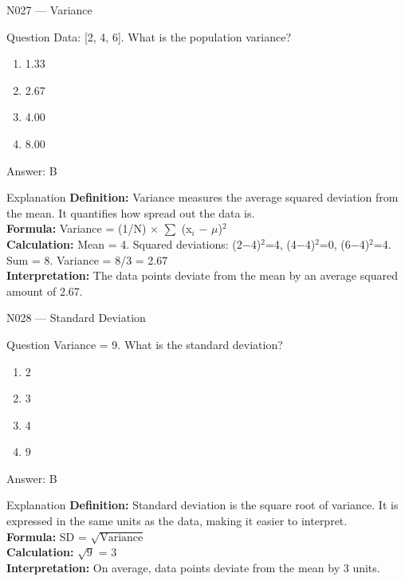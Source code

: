\documentclass[aspectratio=169,8pt]{beamer}
\begin{document}
	\begin{frame}{N027 --- Variance}
		\begin{block}{Question}
			Data: [2, 4, 6]. What is the population variance?
			\begin{enumerate}
				\item 1.33
				\item 2.67
				\item 4.00
				\item 8.00
			\end{enumerate}
		\end{block}
		\begin{exampleblock}{Answer: B}\end{exampleblock}
		\begin{block}{Explanation}
			\textbf{Definition:} Variance measures the average squared deviation from the mean. It quantifies how spread out the data is.\\
			\textbf{Formula:} Variance = (1/N) $\times$ $\sum$ (x$_{i}$ $-$ $\mu$)$^{2}$\\
			\textbf{Calculation:} Mean = 4. Squared deviations: (2$-$4)$^{2}$=4, (4$-$4)$^{2}$=0, (6$-$4)$^{2}$=4. Sum = 8. Variance = 8/3 = 2.67\\
			\textbf{Interpretation:} The data points deviate from the mean by an average squared amount of 2.67.
		\end{block}
	\end{frame}
	
	\begin{frame}{N028 --- Standard Deviation}
		\begin{block}{Question}
			Variance = 9. What is the standard deviation?
			\begin{enumerate}
				\item 2
				\item 3
				\item 4
				\item 9
			\end{enumerate}
		\end{block}
		\begin{exampleblock}{Answer: B}\end{exampleblock}
		\begin{block}{Explanation}
			\textbf{Definition:} Standard deviation is the square root of variance. It is expressed in the same units as the data, making it easier to interpret.\\
			\textbf{Formula:} SD = $\sqrt{\text{Variance}}$\\
			\textbf{Calculation:} $\sqrt{9}$ = 3\\
			\textbf{Interpretation:} On average, data points deviate from the mean by 3 units.
		\end{block}
	\end{frame}
	
\end{document}
